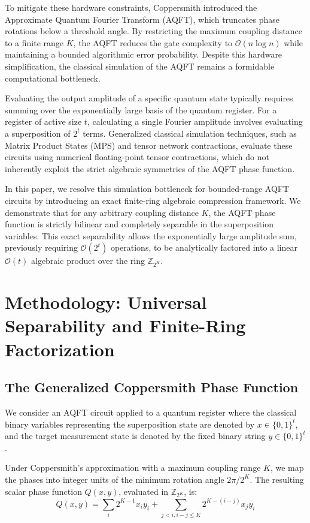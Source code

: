 \documentclass[11pt, a4paper]{article}
\begin{document}
To mitigate these hardware constraints, Coppersmith introduced the Approximate Quantum Fourier Transform (AQFT), which truncates phase rotations below a threshold angle. By restricting the maximum coupling distance to a finite range $K$, the AQFT reduces the gate complexity to $\mathcal{O}(n \log n)$ while maintaining a bounded algorithmic error probability. Despite this hardware simplification, the classical simulation of the AQFT remains a formidable computational bottleneck.

Evaluating the output amplitude of a specific quantum state typically requires summing over the exponentially large basis of the quantum register. For a register of active size $t$, calculating a single Fourier amplitude involves evaluating a superposition of $2^t$ terms. Generalized classical simulation techniques, such as Matrix Product States (MPS) and tensor network contractions, evaluate these circuits using numerical floating-point tensor contractions, which do not inherently exploit the strict algebraic symmetries of the AQFT phase function.

In this paper, we resolve this simulation bottleneck for bounded-range AQFT circuits by introducing an exact finite-ring algebraic compression framework. We demonstrate that for any arbitrary coupling distance $K$, the AQFT phase function is strictly bilinear and completely separable in the superposition variables. This exact separability allows the exponentially large amplitude sum, previously requiring $\mathcal{O}(2^t)$ operations, to be analytically factored into a linear $\mathcal{O}(t)$ algebraic product over the ring $\mathbb{Z}_{2^K}$.

\section{Methodology: Universal Separability and Finite-Ring Factorization}

\subsection{The Generalized Coppersmith Phase Function}
We consider an AQFT circuit applied to a quantum register where the classical binary variables representing the superposition state are denoted by $x \in \{0, 1\}^t$, and the target measurement state is denoted by the fixed binary string $y \in \{0, 1\}^t$. 

Under Coppersmith's approximation with a maximum coupling range $K$, we map the phases into integer units of the minimum rotation angle $2\pi/2^K$. The resulting scalar phase function $Q(x,y)$, evaluated in $\mathbb{Z}_{2^K}$, is:
\begin{equation}
Q(x,y) = \sum_{i} 2^{K-1} x_i y_i + \sum_{j<i, i-j \le K} 2^{K-(i-j)} x_j y_i
\end{equation}
\end{document}
